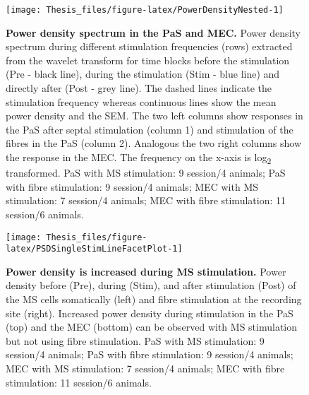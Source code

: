 \documentclass[
  12pt,
  a4paper,
  openany]{book}
\begin{document}
\begin{figure}[htb]

{\centering \texttt{[image: Thesis\_files/figure-latex/PowerDensityNested-1]} 

}

\caption[Power density spectrum in the PaS and MEC]{\textbf{Power density spectrum in the PaS and MEC.} Power density spectrum during different stimulation frequencies (rows) extracted from the wavelet transform for time blocks before the stimulation (Pre - black line), during the stimulation (Stim - blue line) and directly after (Post - grey line). The dashed lines indicate the stimulation frequency whereas continuous lines show the mean power density and the SEM. The two left columns show responses in the PaS after septal stimulation (column 1) and stimulation of the fibres in the PaS (column 2). Analogous the two right columns show the response in the MEC. The frequency on the x-axis is log\textsubscript{2} transformed. PaS with MS stimulation: 9 session/4 animals; PaS with fibre stimulation: 9 session/4 animals; MEC with MS stimulation: 7 session/4 animals; MEC with fibre stimulation: 11 session/6 animals.}\label{fig:PowerDensityNested}
\end{figure}




\begin{figure}[htb]

{\centering \texttt{[image: Thesis\_files/figure-latex/PSDSingleStimLineFacetPlot-1]} 

}

\caption[Power density is increased during MS stimulation]{\textbf{Power density is increased during MS stimulation.} Power density before (Pre), during (Stim), and after stimulation (Post) of the MS cells somatically (left) and fibre stimulation at the recording site (right). Increased power density during stimulation in the PaS (top) and the MEC (bottom) can be observed with MS stimulation but not using fibre stimulation. PaS with MS stimulation: 9 session/4 animals; PaS with fibre stimulation: 9 session/4 animals; MEC with MS stimulation: 7 session/4 animals; MEC with fibre stimulation: 11 session/6 animals.}\label{fig:PSDSingleStimLineFacetPlot}
\end{figure}
\end{document}
